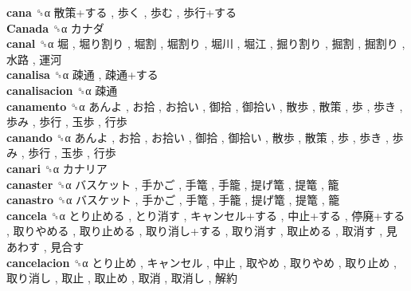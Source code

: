 \textbf{cana} ␝α   散策+する ,  歩く ,  歩む ,  歩行+する   \\
\textbf{Canada} ␝α   カナダ   \\
\textbf{canal} ␝α   堀 ,  堀り割り ,  堀割 ,  堀割り ,  堀川 ,  堀江 ,  掘り割り ,  掘割 ,  掘割り ,  水路 ,  運河   \\
\textbf{canalisa} ␝α   疎通 ,  疎通+する   \\
\textbf{canalisacion} ␝α   疎通   \\
\textbf{canamento} ␝α   あんよ ,  お拾 ,  お拾い ,  御拾 ,  御拾い ,  散歩 ,  散策 ,  歩 ,  歩き ,  歩み ,  歩行 ,  玉歩 ,  行歩   \\
\textbf{canando} ␝α   あんよ ,  お拾 ,  お拾い ,  御拾 ,  御拾い ,  散歩 ,  散策 ,  歩 ,  歩き ,  歩み ,  歩行 ,  玉歩 ,  行歩   \\
\textbf{canari} ␝α   カナリア   \\
\textbf{canaster} ␝α   バスケット ,  手かご ,  手篭 ,  手籠 ,  提げ篭 ,  提篭 ,  籠   \\
\textbf{canastro} ␝α   バスケット ,  手かご ,  手篭 ,  手籠 ,  提げ篭 ,  提篭 ,  籠   \\
\textbf{cancela} ␝α   とり止める ,  とり消す ,  キャンセル+する ,  中止+する ,  停廃+する ,  取りやめる ,  取り止める ,  取り消し+する ,  取り消す ,  取止める ,  取消す ,  見あわす ,  見合す   \\
\textbf{cancelacion} ␝α   とり止め ,  キャンセル ,  中止 ,  取やめ ,  取りやめ ,  取り止め ,  取り消し ,  取止 ,  取止め ,  取消 ,  取消し ,  解約   \\
